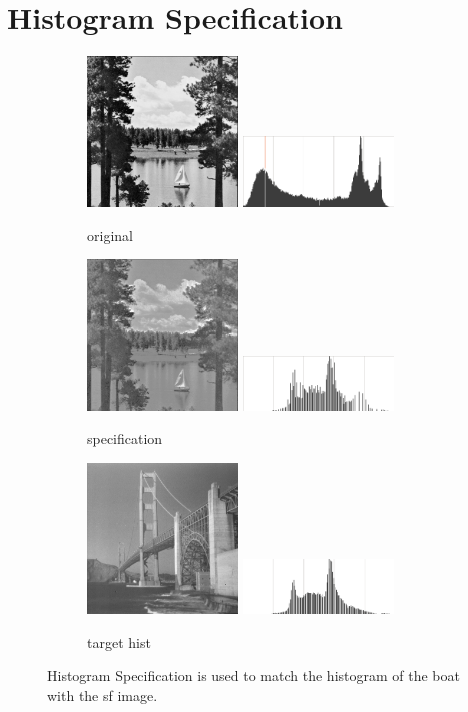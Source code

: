 \documentclass[letterpaper,10pt]{article}
\begin{document}
\section{Histogram Specification}
\begin{figure}[hbtp]
  \centering
  \begin{subfigure}{4cm}
    \includegraphics[width=4cm]{images/boat.png}
    \includegraphics[width=4cm]{images/boat_hist.png}
    \caption{original}
  \end{subfigure}
  \begin{subfigure}{4cm}
    \includegraphics[width=4cm]{images/boat_specification.png}
    \includegraphics[width=4cm]{images/boat_specification_hist.png}
    \caption{specification}
  \end{subfigure}
  \begin{subfigure}{4cm}
    \includegraphics[width=4cm]{images/sf.png}
    \includegraphics[width=4cm]{images/sf_hist.png}
    \caption{target hist}
  \end{subfigure}
  \caption{Histogram Specification is used to match the histogram of the boat with the sf image.}
  \label{fig:specificationboat}
\end{figure}
\end{document}
